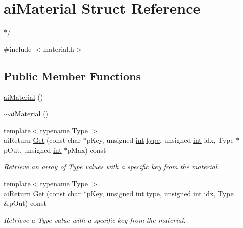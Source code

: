 \hypertarget{structai_material}{\section{ai\-Material Struct Reference}
\label{structai_material}
}


$\ast$/  




{\ttfamily \#include $<$material.\-h$>$}

\subsection*{Public Member Functions}
\begin{DoxyCompactItemize}
\item 
\hyperlink{structai_material_a3c350f89834a7cd3dbc4b4490a0a09dd}{ai\-Material} ()
\item 
\hyperlink{structai_material_a9c4c1c8fd7580777ffffe96b63d4b3f7}{$\sim$ai\-Material} ()
\item 
{\footnotesize template$<$typename Type $>$ }\\ai\-Return \hyperlink{structai_material_ace8dbb50ac9e239eca08292c7c961057}{Get} (const char $\ast$p\-Key, unsigned \hyperlink{_s_d_l__thread_8h_a6a64f9be4433e4de6e2f2f548cf3c08e}{int} \hyperlink{_g_l_e_w_2glew_8h_a7d05960f4f1c1b11f3177dc963a45d86}{type}, unsigned \hyperlink{_s_d_l__thread_8h_a6a64f9be4433e4de6e2f2f548cf3c08e}{int} idx, Type $\ast$p\-Out, unsigned \hyperlink{_s_d_l__thread_8h_a6a64f9be4433e4de6e2f2f548cf3c08e}{int} $\ast$p\-Max) const 
\begin{DoxyCompactList}\small\item\em Retrieve an array of Type values with a specific key from the material. \end{DoxyCompactList}\item 
{\footnotesize template$<$typename Type $>$ }\\ai\-Return \hyperlink{structai_material_a6813bb11ee8d1de9d1d99a60cdb304d3}{Get} (const char $\ast$p\-Key, unsigned \hyperlink{_s_d_l__thread_8h_a6a64f9be4433e4de6e2f2f548cf3c08e}{int} \hyperlink{_g_l_e_w_2glew_8h_a7d05960f4f1c1b11f3177dc963a45d86}{type}, unsigned \hyperlink{_s_d_l__thread_8h_a6a64f9be4433e4de6e2f2f548cf3c08e}{int} idx, Type \&p\-Out) const 
\begin{DoxyCompactList}\small\item\em Retrieve a Type value with a specific key from the material. \end{DoxyCompactList}\item 

\end{DoxyCompactItemize}
